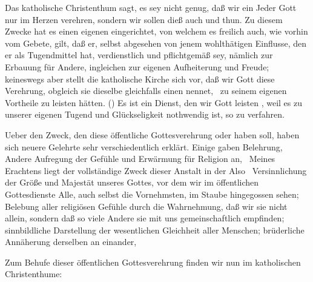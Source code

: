 Das katholische Christenthum sagt, es sey nicht genug, daß wir ein Jeder Gott nur im Herzen verehren, sondern wir sollen dieß auch  und  thun. Zu diesem Zwecke hat es einen eigenen  eingerichtet, von welchem es freilich auch, wie vorhin vom Gebete, gilt, daß er, selbst abgesehen von jenem wohlthätigen Einflusse, den er als Tugendmittel hat, verdienstlich und pflichtgemäß sey, nämlich zur Erbauung für Andere, ingleichen zur eigenen Aufheiterung und Freude; keineswegs aber stellt die katholische Kirche sich vor, daß wir Gott diese Verehrung, obgleich sie dieselbe gleichfalls einen  nennet,  \dh\  zu seinem eigenen Vortheile zu leisten hätten. () Es ist ein Dienst, den wir Gott leisten , weil es zu unserer eigenen Tugend und Glückseligkeit nothwendig ist, so zu verfahren.
\begin{RWanm} 
Ueber den Zweck, den diese öffentliche Gottesverehrung oder  haben soll, haben sich neuere Gelehrte sehr verschiedentlich erklärt. Einige gaben Belehrung, Andere Aufregung der Gefühle und Erwärmung für Religion an, \udgl\  Meines Erachtens liegt der vollständige Zweck dieser Anstalt in der  Also \zB\  Versinnlichung der Größe und Majestät unseres Gottes, vor dem wir im öffentlichen Gottesdienste Alle, auch selbst die Vornehmsten, im Staube hingegossen sehen; Belebung aller religiösen Gefühle durch die Wahrnehmung, daß wir sie nicht allein, sondern daß so viele Andere sie mit uns gemeinschaftlich empfinden; sinnbildliche Darstellung der wesentlichen Gleichheit aller Menschen; brüderliche Annäherung derselben an einander, \usw\ 
\end{RWanm}
Zum Behufe dieser öffentlichen Gottesverehrung finden wir nun im katholischen Christenthume:
